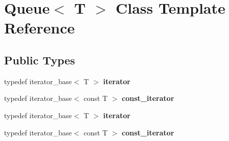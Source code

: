 \hypertarget{classQueue}{\section{Queue$<$ T $>$ Class Template Reference}
\label{classQueue}
}
\subsection*{Public Types}
\begin{DoxyCompactItemize}
\item 
\hypertarget{classQueue_abc9e9289124dc3ae5377a7e3d3fbe928}{typedef iterator\-\_\-base$<$ T $>$ {\bfseries iterator}}\label{classQueue_abc9e9289124dc3ae5377a7e3d3fbe928}

\item 
\hypertarget{classQueue_a10a22f024abb831966e98b859bb2e64d}{typedef iterator\-\_\-base$<$ const T $>$ {\bfseries const\-\_\-iterator}}\label{classQueue_a10a22f024abb831966e98b859bb2e64d}

\item 
\hypertarget{classQueue_abc9e9289124dc3ae5377a7e3d3fbe928}{typedef iterator\-\_\-base$<$ T $>$ {\bfseries iterator}}\label{classQueue_abc9e9289124dc3ae5377a7e3d3fbe928}

\item 
\hypertarget{classQueue_a10a22f024abb831966e98b859bb2e64d}{typedef iterator\-\_\-base$<$ const T $>$ {\bfseries const\-\_\-iterator}}\label{classQueue_a10a22f024abb831966e98b859bb2e64d}

\end{DoxyCompactItemize}
